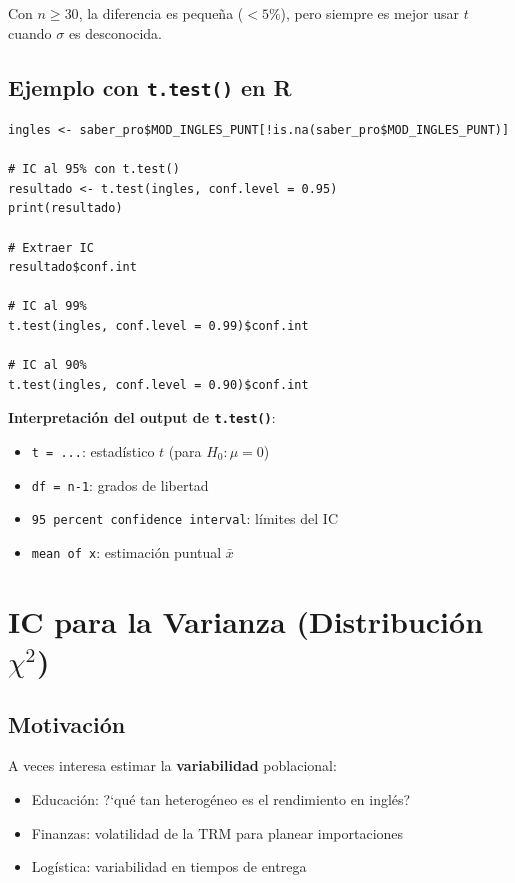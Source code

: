 \documentclass[11pt, a4paper]{article}
\begin{document}
Con $n \geq 30$, la diferencia es peque\~na ($<5\%$), pero siempre es mejor usar $t$ cuando $\sigma$ es desconocida.

\subsection{Ejemplo con \texttt{t.test()} en R}

\begin{lstlisting}
ingles <- saber_pro$MOD_INGLES_PUNT[!is.na(saber_pro$MOD_INGLES_PUNT)]

# IC al 95% con t.test()
resultado <- t.test(ingles, conf.level = 0.95)
print(resultado)

# Extraer IC
resultado$conf.int

# IC al 99%
t.test(ingles, conf.level = 0.99)$conf.int

# IC al 90%
t.test(ingles, conf.level = 0.90)$conf.int
\end{lstlisting}

\textbf{Interpretaci\'on del output de \texttt{t.test()}}:
\begin{itemize}
  \item \texttt{t = ...}: estad\'istico $t$ (para $H_0: \mu = 0$)
  \item \texttt{df = n-1}: grados de libertad
  \item \texttt{95 percent confidence interval}: l\'imites del IC
  \item \texttt{mean of x}: estimaci\'on puntual $\bar{x}$
\end{itemize}

\section{IC para la Varianza (Distribuci\'on $\chi^2$)}

\subsection{Motivaci\'on}

A veces interesa estimar la \textbf{variabilidad} poblacional:
\begin{itemize}
  \item Educaci\'on: ?`qu\'e tan heterog\'eneo es el rendimiento en ingl\'es?
  \item Finanzas: volatilidad de la TRM para planear importaciones
  \item Log\'istica: variabilidad en tiempos de entrega
\end{itemize}
\end{document}
